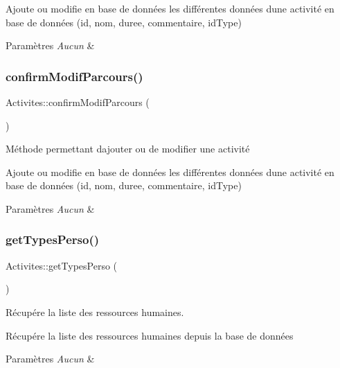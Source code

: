 Ajoute ou modifie en base de données les différentes données d\textquotesingle{}une activité en base de données (id, nom, duree, commentaire, id\+Type) 
\begin{DoxyParams}{Paramètres}
{\em Aucun} & \\
\hline
\end{DoxyParams}
\mbox{\label{class_activites_ad07bebfc4ff3edd4b6361f70e3005ff4}} 
\subsubsection{\texorpdfstring{confirm\+Modif\+Parcours()}{confirmModifParcours()}}
{\footnotesize\ttfamily Activites\+::confirm\+Modif\+Parcours (\begin{DoxyParamCaption}{ }\end{DoxyParamCaption})}



Méthode permettant d\textquotesingle{}ajouter ou de modifier une activité 

Ajoute ou modifie en base de données les différentes données d\textquotesingle{}une activité en base de données (id, nom, duree, commentaire, id\+Type) 
\begin{DoxyParams}{Paramètres}
{\em Aucun} & \\
\hline
\end{DoxyParams}
\mbox{\label{class_activites_a1c472cf69b80e63303e6ec52f6d2a2f6}} 
\subsubsection{\texorpdfstring{get\+Types\+Perso()}{getTypesPerso()}}
{\footnotesize\ttfamily Activites\+::get\+Types\+Perso (\begin{DoxyParamCaption}{ }\end{DoxyParamCaption})}



Récupére la liste des ressources humaines. 

Récupére la liste des ressources humaines depuis la base de données 
\begin{DoxyParams}{Paramètres}
{\em Aucun} & \\
\hline
\end{DoxyParams}
\mbox{\label{class_activites_aac89ad70171f46fd1efc8869334678a4}} 
